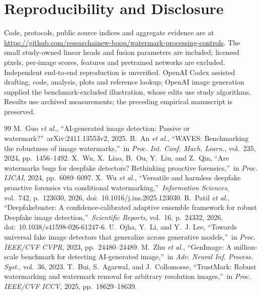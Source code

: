 \documentclass[conference]{IEEEtran}
\begin{document}
\section*{Reproducibility and Disclosure}
Code, protocols, public source indices and aggregate evidence are at
\url{https://github.com/researchainew-boop/watermark-processing-controls}.
The small study-owned linear heads and fusion parameters are included;
licensed pixels, per-image scores, features and pretrained networks are excluded.
Independent end-to-end reproduction is unverified. OpenAI Codex assisted drafting, code,
analysis, plots and reference lookup; OpenAI image generation supplied the
benchmark-excluded illustration, whose edits use study algorithms.
Results use archived measurements;
the preceding empirical manuscript is preserved.
\begin{thebibliography}{99}
M.~Guo \emph{et al.}, \textquotedblleft AI-generated image detection: Passive or watermark?\textquotedblright\ arXiv:2411.13553v2, 2025.
B.~An \emph{et al.}, \textquotedblleft WAVES: Benchmarking the robustness of image watermarks,\textquotedblright\ in \emph{Proc. Int. Conf. Mach. Learn.}, vol.~235, 2024, pp.~1456--1492.
X.~Wu, X.~Liao, B.~Ou, Y.~Liu, and Z.~Qin, \textquotedblleft Are watermarks bugs for deepfake detectors? Rethinking proactive forensics,\textquotedblright\ in \emph{Proc. IJCAI}, 2024, pp.~6089--6097.
X.~Wu \emph{et al.}, \textquotedblleft Versatile and harmless deepfake proactive forensics via conditional watermarking,\textquotedblright\ \emph{Information Sciences}, vol.~742, p.~123030, 2026, doi:~10.1016/j.ins.2025.123030.
R.~Patil \emph{et al.}, \textquotedblleft Deepfakebuster: A confidence-calibrated adaptive ensemble framework for robust Deepfake image detection,\textquotedblright\ \emph{Scientific Reports}, vol.~16, p.~24332, 2026, doi:~10.1038/s41598-026-61247-6.
U.~Ojha, Y.~Li, and Y.~J. Lee, \textquotedblleft Towards universal fake image detectors that generalize across generative models,\textquotedblright\ in \emph{Proc. IEEE/CVF CVPR}, 2023, pp.~24480--24489.
M.~Zhu \emph{et al.}, \textquotedblleft GenImage: A million-scale benchmark for detecting AI-generated image,\textquotedblright\ in \emph{Adv. Neural Inf. Process. Syst.}, vol.~36, 2023.
T.~Bui, S.~Agarwal, and J.~Collomosse, \textquotedblleft TrustMark: Robust watermarking and watermark removal for arbitrary resolution images,\textquotedblright\ in \emph{Proc. IEEE/CVF ICCV}, 2025, pp.~18629--18639.

\end{thebibliography}
\end{document}
